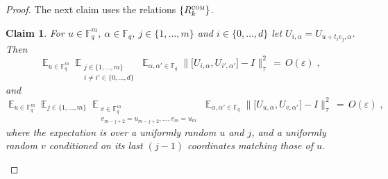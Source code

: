 \documentclass[11pt]{article}
\newtheorem{claim}[theorem]{Claim}
\theoremstyle{definition}
\newcommand{\Id}{\ensuremath{I}}
\DeclareMathOperator*{\Expectation}{\mathbb{E}}
\newcommand{\Es}[1]{\Expectation_{#1}}
\newcommand{\F}{\ensuremath{\mathbb{F}}}
\newcommand{\com}{\textsc{com}}
\newcommand{\eps}{\varepsilon}
\DeclareMathOperator{\tr}{tr}
\begin{document}
\begin{proof}

The next claim uses the relations $\{R^\com_k\}$.

\begin{claim}\label{claim:z2-stab-2b}
For $u\in \F_q^m$, $\alpha\in\F_q$, $j\in\{1,\ldots,m\}$ and $i\in \{0,\ldots,d\}$ let $U_{i,\alpha} = U_{u+t_ie_j,\alpha}$. Then 
\begin{equation}\label{eq:z2-stab-2b-0a}
\Es{u\in \F_q^m} \Es{\substack{j\in\{1,\ldots,m\}\\i\neq i' \in \{0,\ldots,d\}}}\Es{\alpha,\alpha'\in \F_q} \big\| \big[ U_{i,\alpha}, U_{i',\alpha'}\big]-\Id\big\|_\tau^2\,=\, O({\eps})\;, 
\end{equation}
and
\begin{equation}\label{eq:z2-stab-2b-0b}
 \Es{u\in \F_q^m} \Es{j\in\{1,\ldots,m\}} \Es{\substack{v\in \F_q^m \\v_{m-j+2}=u_{m-j+2},\ldots,v_m=u_m}}\Es{\alpha,\alpha'\in \F_q} \big\| \big[ U_{u,\alpha}, U_{v,\alpha'}\big]-\Id\big\|_\tau^2\,=\, O({\eps})\;,
\end{equation}
where the expectation is over a uniformly random $u$ and $j$, and a uniformly random $v$ conditioned on its last $(j-1)$ coordinates matching those of $u$. 
\end{claim}


\end{proof}
\end{document}
